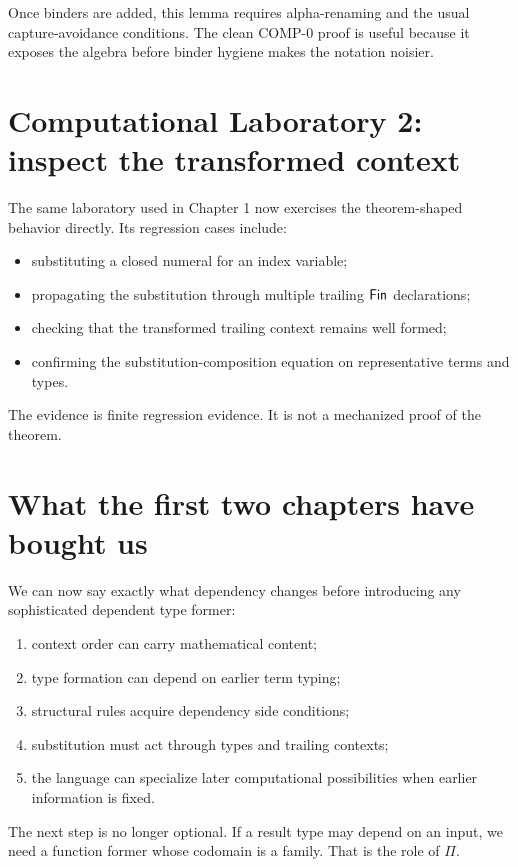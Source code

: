 \documentclass[11pt,openany]{book}
\begin{document}
Once binders are added, this lemma requires alpha-renaming and the usual capture-avoidance conditions. The clean COMP-0 proof is useful because it exposes the algebra before binder hygiene makes the notation noisier.

\section{Computational Laboratory 2: inspect the transformed context}

The same laboratory used in Chapter 1 now exercises the theorem-shaped behavior directly. Its regression cases include:

\begin{itemize}
\item substituting a closed numeral for an index variable;
\item propagating the substitution through multiple trailing $\mathsf{Fin}$ declarations;
\item checking that the transformed trailing context remains well formed;
\item confirming the substitution-composition equation on representative terms and types.
\end{itemize}

The evidence is finite regression evidence. It is not a mechanized proof of the theorem.



\section{What the first two chapters have bought us}

We can now say exactly what dependency changes before introducing any sophisticated dependent type former:

\begin{enumerate}
\item context order can carry mathematical content;
\item type formation can depend on earlier term typing;
\item structural rules acquire dependency side conditions;
\item substitution must act through types and trailing contexts;
\item the language can specialize later computational possibilities when earlier information is fixed.
\end{enumerate}

The next step is no longer optional. If a result type may depend on an input, we need a function former whose codomain is a family. That is the role of $\Pi$.
\end{document}
